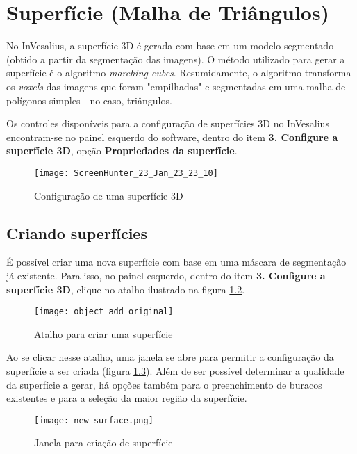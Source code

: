 \chapter{Superfície (Malha de Triângulos)}
\label{cap_surface}

No InVesalius, a superfície 3D é gerada com base em um modelo segmentado (obtido a partir
da segmentação das imagens). O método utilizado para gerar a superfície é o algoritmo 
\textit{marching cubes}. Resumidamente, o algoritmo transforma os \textit{voxels} das
imagens que foram "empilhadas" e segmentadas em uma malha de polígonos simples - no caso,
triângulos.

Os controles disponíveis para a configuração de superfícies 3D no InVesalius encontram-se
no painel esquerdo do software, dentro do item \textbf{3. Configure a superfície 3D}, opção
\textbf{Propriedades da superfície}.

\begin{figure}[!htb]
\centering
\texttt{[image: ScreenHunter\_23\_Jan\_23\_23\_10]}
\caption{Configuração de uma superfície 3D}
\label{fig:3d_surface_managment}
\end{figure}


\section{Criando superfícies}

É possível criar uma nova superfície com base em uma máscara de segmentação já existente.
Para isso, no painel esquerdo, dentro do item \textbf{3. Configure a superfície 3D}, clique
no atalho ilustrado na figura \ref{fig:shortcut_new_surface}.

\begin{figure}[!htb]
\centering
\texttt{[image: object\_add\_original]}
\caption{Atalho para criar uma superfície}
\label{fig:shortcut_new_surface}
\end{figure}

Ao se clicar nesse atalho, uma janela se abre para permitir a configuração da superfície a
ser criada (figura \ref{fig:create_surface_1}). Além de ser possível determinar a qualidade
da superfície a gerar, há opções também para o preenchimento de buracos existentes e para a
seleção da maior região da superfície.

\begin{figure}[!htb]
\centering
\texttt{[image: new\_surface.png]}
\caption{Janela para criação de superfície}
\label{fig:create_surface_1}
\end{figure}

